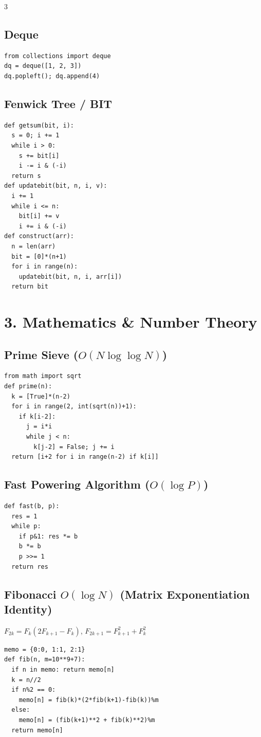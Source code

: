 \documentclass[8pt,a4paper,landscape]{extarticle}
\begin{document}
\begin{multicols*}{3}
\subsection*{Deque}
\begin{lstlisting}
from collections import deque
dq = deque([1, 2, 3])
dq.popleft(); dq.append(4)
\end{lstlisting}

\subsection*{Fenwick Tree / BIT}
\begin{lstlisting}
def getsum(bit, i):
  s = 0; i += 1
  while i > 0:
    s += bit[i]
    i -= i & (-i)
  return s
def updatebit(bit, n, i, v):
  i += 1
  while i <= n:
    bit[i] += v
    i += i & (-i)
def construct(arr):
  n = len(arr)
  bit = [0]*(n+1)
  for i in range(n):
    updatebit(bit, n, i, arr[i])
  return bit
\end{lstlisting}

\section*{3. Mathematics \& Number Theory}

\subsection*{Prime Sieve ($O(N \log \log N)$)}
\begin{lstlisting}
from math import sqrt
def prime(n):
  k = [True]*(n-2)
  for i in range(2, int(sqrt(n))+1):
    if k[i-2]:
      j = i*i
      while j < n:
        k[j-2] = False; j += i
  return [i+2 for i in range(n-2) if k[i]]
\end{lstlisting}

\subsection*{Fast Powering Algorithm ($O(\log P)$)}
\begin{lstlisting}
def fast(b, p):
  res = 1
  while p:
    if p&1: res *= b
    b *= b
    p >>= 1
  return res
\end{lstlisting}

\subsection*{Fibonacci $O(\log N)$ (Matrix Exponentiation Identity)}
$F_{2k} = F_k(2F_{k+1} - F_k)$, $F_{2k+1} = F_{k+1}^2 + F_k^2$
\begin{lstlisting}
memo = {0:0, 1:1, 2:1}
def fib(n, m=10**9+7):
  if n in memo: return memo[n]
  k = n//2
  if n%2 == 0:
    memo[n] = fib(k)*(2*fib(k+1)-fib(k))%m
  else:
    memo[n] = (fib(k+1)**2 + fib(k)**2)%m
  return memo[n]
\end{lstlisting}


\end{multicols*}
\end{document}
